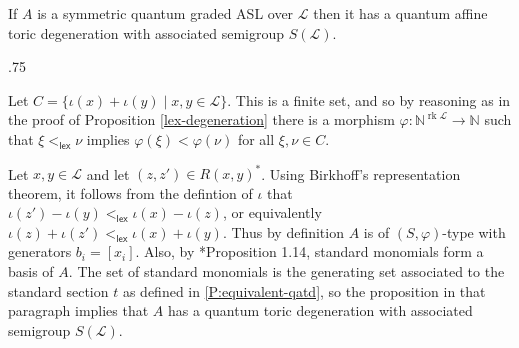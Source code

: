 \documentclass[11pt,fleqn]{article}
\makeatletter
\renewenvironment{proof}[1][\textit{Proof}]{\par
  \pushQED{\qed}%
  \normalfont \topsep.75\paraskip\relax
  \trivlist
  \item[\hskip\labelsep
        \itshape
    #1\@addpunct{.}]\ignorespaces
}{%
  \popQED\endtrivlist\@endpefalse
}
\newcommand\NN{\mathbb N}
\renewcommand\to{\longrightarrow}
\renewcommand\phi{\varphi}
\renewcommand\L{\mathcal L}
\newcommand\lex{\mathsf{lex}}
\DeclareMathOperator\rk{rk}
\makeatother
\begin{document}
\begin{Theorem} 
\label{T:ASL-are-dominated} 
If $A$ is a symmetric quantum graded ASL over $\L$ then it has a quantum affine toric 
degeneration with associated semigroup $S(\L)$.
\end{Theorem} 
\begin{proof} 
Let $C = \{\iota(x) + \iota(y) \mid x,y \in \L\}$. This is a finite set, and so by 
reasoning as in the proof of Proposition \ref{lex-degeneration} there is a morphism 
$\phi: \NN^{\rk \L} \to \NN$ such that $\xi <_{\lex} \nu$ implies $\phi(\xi) < 
\phi(\nu)$ for all $\xi, \nu \in C$. 

Let $x,y \in \L$ and let $(z,z') \in R(x,y)^*$. Using Birkhoff's representation theorem, 
it follows from the defintion of $\iota$ that $\iota(z') - \iota(y) <_{\lex} \iota(x) - 
\iota(z)$, or equivalently $\iota(z) + \iota(z') <_{\lex} \iota(x) + \iota(y)$. Thus by 
definition $A$ is of $(S,\phi)$-type with generators $b_i = [x_i]$. Also, by 
\cite{LR1}*{Proposition 1.14}, standard monomials form a basis of $A$. The set of 
standard monomials is the generating set associated to the standard section $t$ as 
defined in \ref{P:equivalent-qatd}, so the proposition in that paragraph implies that
$A$ has a quantum toric degeneration with associated semigroup $S(\L)$.
\end{proof}
\end{document}
